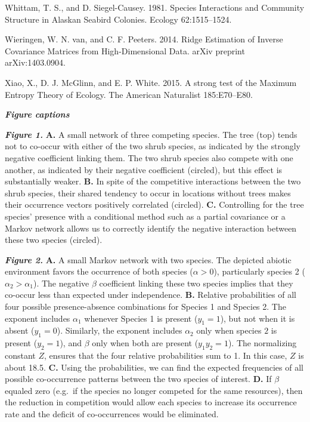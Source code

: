 \documentclass[12pt,]{article}
\begin{document}
\begin{spacing}{1.9}
\begin{flushleft}
Whittam, T. S., and D. Siegel-Causey. 1981. Species Interactions and
Community Structure in Alaskan Seabird Colonies. Ecology 62:1515--1524.

Wieringen, W. N. van, and C. F. Peeters. 2014. Ridge Estimation of
Inverse Covariance Matrices from High-Dimensional Data. arXiv preprint
arXiv:1403.0904.

Xiao, X., D. J. McGlinn, and E. P. White. 2015. A strong test of the
Maximum Entropy Theory of Ecology. The American Naturalist 185:E70--E80.


\textbf{\emph{Figure captions}}

\textbf{\emph{Figure 1.}} \textbf{A.} A small network of three competing
species. The tree (top) tends not to co-occur with either of the two
shrub species, as indicated by the strongly negative coefficient linking
them. The two shrub species also compete with one another, as indicated
by their negative coefficient (circled), but this effect is
substantially weaker. \textbf{B.} In spite of the competitive
interactions between the two shrub species, their shared tendency to
occur in locations without trees makes their occurrence vectors
positively correlated (circled). \textbf{C.} Controlling for the tree
species' presence with a conditional method such as a partial covariance
or a Markov network allows us to correctly identify the negative
interaction between these two species (circled).

\textbf{\emph{Figure 2.}} \textbf{A.} A small Markov network with two
species. The depicted abiotic environment favors the occurrence of both
species (\(\alpha >0\)), particularly species 2
(\(\alpha_2 > \alpha_1\)). The negative \(\beta\) coefficient linking
these two species implies that they co-occur less than expected under
independence. \textbf{B.} Relative probabilities of all four possible
presence-absence combinations for Species 1 and Species 2. The exponent
includes \(\alpha_1\) whenever Species 1 is present (\(y_1 = 1\)), but
not when it is absent (\(y_1 = 0\)). Similarly, the exponent includes
\(\alpha_2\) only when species \(2\) is present (\(y_2 = 1\)), and
\(\beta\) only when both are present (\(y_1y_2 = 1\)). The normalizing
constant \(Z\), ensures that the four relative probabilities sum to 1.
In this case, \(Z\) is about 18.5. \textbf{C.} Using the probabilities,
we can find the expected frequencies of all possible co-occurrence
patterns between the two species of interest. \textbf{D.} If \(\beta\)
equaled zero (e.g.~if the species no longer competed for the same
resources), then the reduction in competition would allow each species
to increase its occurrence rate and the deficit of co-occurrences would
be eliminated.


\end{flushleft}
\end{spacing}
\end{document}
